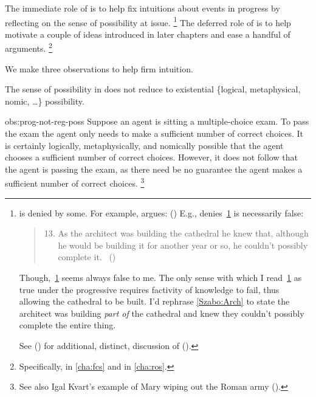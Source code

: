 \begin{note}
  The immediate role of \assuPP{} is to help fix intuitions about events in progress by reflecting on the sense of possibility at issue.%
  \footnote{
     is denied by some.
    For example, \citeauthor{Szabo:2004ul} argues:
    (\citeyear[40]{Szabo:2004ul})
    E.g., \citeauthor{Szabo:2004ul} denies~\ref{Szabo:Arch} is necessarily false:
    \begin{quote}
      \begin{enumerate}[label=(\arabic*), ref=(\arabic*)]
        \setcounter{enumi}{12}
      \item
        \label{Szabo:Arch}
        As the architect was building the cathedral he knew that, although he would be building it for another year or so, he couldn't possibly complete it.%
        \mbox{ }\hfill\mbox{(\citeyear[38]{Szabo:2004ul})}
      \end{enumerate}
    \end{quote}
    Though,~\ref{Szabo:Arch} seems always false to me.
    The only sense with which I read~\ref{Szabo:Arch} as true under the progressive requires factivity of knowledge to fail, thus allowing the cathedral to be built.
    I'd rephrase \autoref{Szabo:Arch} to state the architect was building \emph{part of} the cathedral and knew they couldn't possibly complete the entire thing.

    See (\cite[1245]{Portner:2011vi}) for additional, distinct, discussion of (\cite{Szabo:2004ul}).
  }
  The deferred role of \assuPP{} is to help motivate a couple of ideas introduced in later chapters and ease a handful of arguments.%
  \footnote{
    Specifically,  in \autoref{cha:fcs} and  in \autoref{cha:ros}.
  }

  We make three observations to help firm intuition.

  \begin{observation}%
    \label{obs:prog-not-reg-poss}%
    The sense of possibility in \assuPP{} does not reduce to existential \{logical, metaphysical, nomic, \dots\} possibility.
  \end{observation}
  \begin{motivation}{obs:prog-not-reg-poss}
    Suppose an agent is sitting a multiple-choice exam.
    To pass the exam the agent only needs to make a sufficient number of correct choices.
    It is certainly logically, metaphysically, and nomically possible that the agent chooses a sufficient number of correct choices.
    However, it does not follow that the agent is passing the exam, as there need be no guarantee the agent makes a sufficient number of correct choices.%
    \footnote{
      See also Igal Kvart's example of Mary wiping out the Roman army (\cite[18]{Landman:1992wh}).
    }
  \end{motivation}


\end{note}
